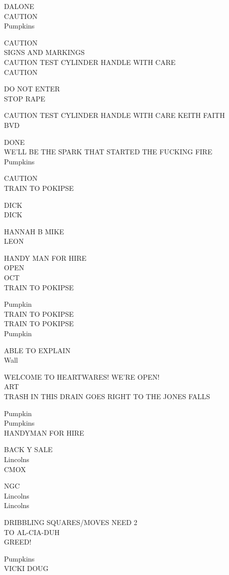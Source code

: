 \documentclass[10pt,letterpaper]{article}
\begin{document}
DALONE\\
CAUTION\\
Pumpkins

CAUTION\\
SIGNS AND MARKINGS\\
CAUTION TEST CYLINDER HANDLE WITH CARE\\
CAUTION

DO NOT ENTER\\
STOP RAPE

CAUTION TEST CYLINDER HANDLE WITH CARE KEITH FAITH\\
BVD

DONE\\
WE'LL BE THE SPARK THAT STARTED THE FUCKING FIRE\\
Pumpkins

CAUTION\\
TRAIN TO POKIPSE

DICK\\
DICK

HANNAH B MIKE\\
LEON

HANDY MAN FOR HIRE\\
OPEN\\
OCT\\
TRAIN TO POKIPSE

Pumpkin\\
TRAIN TO POKIPSE\\
TRAIN TO POKIPSE\\
Pumpkin

ABLE TO EXPLAIN\\
Wall

WELCOME TO HEARTWARES!  WE'RE OPEN!\\
ART\\
TRASH IN THIS DRAIN GOES RIGHT TO THE JONES FALLS

Pumpkin\\
Pumpkins\\
HANDYMAN FOR HIRE

BACK Y SALE\\
Lincolns\\
CMOX

NGC\\
Lincolns\\
Lincolns

DRIBBLING SQUARES/MOVES NEED 2\\
TO AL{-}CIA{-}DUH\\
GREED!

Pumpkins\\
VICKI DOUG
\end{document}
